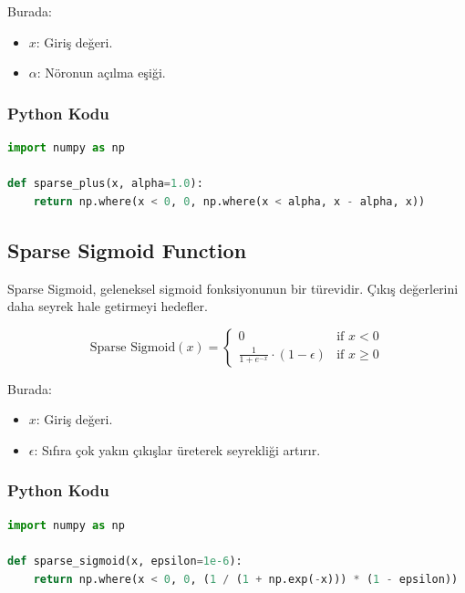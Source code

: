 Burada:

\begin{itemize}
    \item $x$: Giriş değeri.
    \item $\alpha$: Nöronun açılma eşiği.
\end{itemize}

\subsubsection{Python Kodu}

\begin{lstlisting}[language=Python]
import numpy as np

def sparse_plus(x, alpha=1.0):
    return np.where(x < 0, 0, np.where(x < alpha, x - alpha, x))
\end{lstlisting}

\newpage

\subsection{Sparse Sigmoid Function}

Sparse Sigmoid, geleneksel sigmoid fonksiyonunun bir türevidir. Çıkış değerlerini daha seyrek hale getirmeyi hedefler. 

\[
\text{Sparse Sigmoid}(x) = 
\begin{cases} 
0 & \text{if } x < 0 \\ 
\frac{1}{1 + e^{-x}} \cdot (1 - \epsilon) & \text{if } x \geq 0 
\end{cases}
\]

Burada:

\begin{itemize}
    \item $x$: Giriş değeri.
    \item $\epsilon$: Sıfıra çok yakın çıkışlar üreterek seyrekliği artırır.
\end{itemize}

\subsubsection{Python Kodu}

\begin{lstlisting}[language=Python]
import numpy as np

def sparse_sigmoid(x, epsilon=1e-6):
    return np.where(x < 0, 0, (1 / (1 + np.exp(-x))) * (1 - epsilon))
\end{lstlisting}

